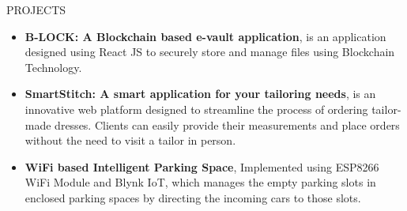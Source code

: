 \documentclass{resume} %
\begin{document}
\begin{rSection}{PROJECTS}
\begin{itemize}

    \item \textbf{B-LOCK: A Blockchain based e-vault application}{, is 
    an application designed using React JS to securely store and manage 
    files using Blockchain Technology. 
    }
 

\item \textbf{SmartStitch: A smart application for your tailoring needs}{, is an innovative web platform designed to streamline the process of ordering tailor-made dresses. 
Clients can easily provide their measurements and place orders without the need to visit a tailor in person.
}


\item \textbf{WiFi based Intelligent Parking Space}{, Implemented using ESP8266 WiFi Module and Blynk IoT, which manages the empty parking slots in enclosed parking spaces by directing the incoming cars to those slots.}
\end{itemize}

\end{rSection}
\end{document}
